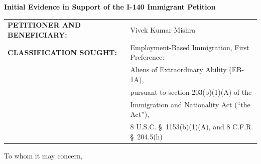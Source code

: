 \newcommand{\fie}{Applied Artificial Intelligence and Machine Learning in Critical Infrastructure Systems}

\begin{center}
 \Large{\textbf{Initial Evidence in Support of the I-140 Immigrant Petition}}
\end{center}

\vspace{4em}


\begin{tabular}{@{}ll@{}}
\textbf{PETITIONER AND BENEFICIARY:} & Vivek Kumar Mishra\\[0.6em]
\textbf{CLASSIFICATION SOUGHT:} & Employment-Based Immigration, First Preference:\\
& Aliens of Extraordinary Ability (EB-1A),\\
& pursuant to section 203(b)(1)(A) of the\\
& Immigration and Nationality Act (``the Act''),\\
& 8 U.S.C. \S~1153(b)(1)(A), and 8 C.F.R. \S~204.5(h)\\
\end{tabular}

\vspace{2em}


To whom it may concern,

\vspace{2em}






\newcommand{\qu}[1]{\say{\emph{#1}}}




